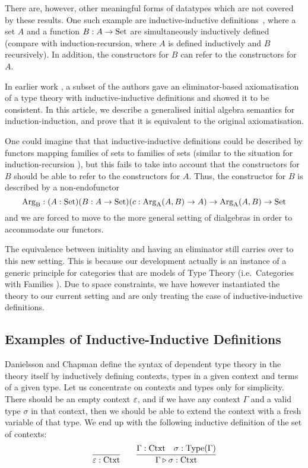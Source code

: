 \documentclass[orivec,envcountsame, ,envcountsect]{llncs}
\begin{document}
There are, however, other meaningful forms of datatypes which are not
covered by these results. One such example are inductive-inductive
definitions~\cite{nordvallforsbergSetzer2010indind}, where a set $A$
and a function $B : A \to \text{Set}$ are simultaneously inductively defined
(compare with induction-recursion, where $A$ is defined inductively
and $B$ recursively). In addition, the constructors for $B$ can refer
to the constructors for $A$.

In earlier work \cite{nordvallforsbergSetzer2010indind}, a subset of
the authors gave an eliminator-based axiomatisation of a type theory
with inductive-inductive definitions and showed it to be
consistent. In this article, we describe a generalised initial algebra
semantics for induction-induction, and prove that it is equivalent to
the original axiomatisation.

One could imagine that that inductive-inductive definitions could be
described by functors mapping families of sets to families of sets
(similar to the situation for induction-recursion
\cite{dybjersetzer2003inalg}), but this fails to take into account
that the constructors for $B$ should be able to refer to the
constructors for $A$. Thus, the constructor for $B$ is described by a
non-endofunctor
\[
\text{Arg}_{\text{B}} : (A : \text{Set})(B : A \to \text{Set})(c : \text{Arg}_{\text{A}}(A, B) \to A) \to \text{Arg}_{\text{A}}(A, B) \to \text{Set}
\]
and we are forced to move to the more general setting of dialgebras
\cite{hagino1987phdthesis,fokkinga1996datatypeLaws,pollZwanenburg2001dialgebra}
in order to accommodate our functors. 

The equivalence between initiality and having an eliminator still
carries over to this new setting. This is because our development
actually is an instance of a generic principle for categories that are
models of Type Theory (i.e.\ Categories with Families
\cite{dybjer1996internalTT,hofmann1997syntaxsemantics}). Due to space
constraints, we have however instantiated the theory to our current
setting and are only treating the case of inductive-inductive
definitions.


\subsection{Examples of Inductive-Inductive Definitions}
\label{sec:ex-indind}

Danielsson \cite{danielsson2007formalisation} and Chapman
\cite{chapman2009eatitself} define the syntax of dependent type theory
in the theory itself by inductively defining contexts, types in a
given context and terms of a given type. Let us concentrate on
contexts and types only for simplicity. There should be an empty
context $\varepsilon$, and if we have any context $\Gamma$ and a valid
type $\sigma$ in that context, then we should be able to extend the
context with a fresh variable of that type. We end up with the
following inductive definition of the set of contexts:
\[
\infer{\emptyCtxt : \Ctxt}{} \qquad
\infer{\consCtxt{\Gamma}{\sigma} : \Ctxt}{\Gamma : \Ctxt & \sigma : \Type(\Gamma)}
\]
\end{document}

